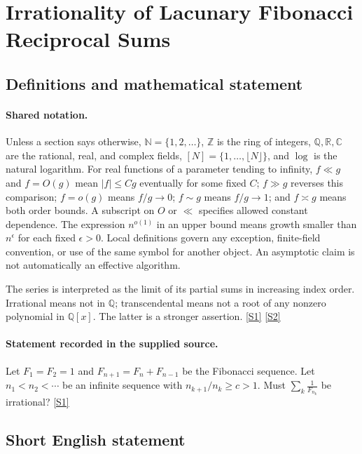 \documentclass[11pt,a4paper]{article}
\newcommand{\N}{\mathbb{N}}
\newcommand{\Z}{\mathbb{Z}}
\newcommand{\Q}{\mathbb{Q}}
\newcommand{\R}{\mathbb{R}}
\newcommand{\C}{\mathbb{C}}
\newcommand{\sref}[2]{\hyperlink{source:#1:#2}{[S#2]}}
\begin{document}
\section{Irrationality of Lacunary Fibonacci Reciprocal Sums}\label{statement}


\subsection{Definitions and mathematical statement}

\paragraph{Shared notation.}Unless a section says otherwise, $\N=\{1,2,\ldots\}$,
$\Z$ is the ring of integers, $\Q,\R,\C$ are the rational, real, and complex
fields, $[N]=\{1,\ldots,\lfloor N\rfloor\}$, and $\log$ is the natural
logarithm. For real functions of a parameter tending to infinity,
$f\ll g$ and $f=O(g)$ mean $|f|\leq Cg$ eventually for some fixed $C$;
$f\gg g$ reverses this comparison; $f=o(g)$ means $f/g\to0$;
$f\sim g$ means $f/g\to1$; and $f\asymp g$ means both order bounds.
A subscript on $O$ or $\ll$ specifies allowed constant dependence.
The expression $n^{o(1)}$ in an upper bound means growth smaller than
$n^\epsilon$ for each fixed $\epsilon>0$. Local definitions govern any
exception, finite-field convention, or use of the same symbol for another
object. An asymptotic claim is not automatically an effective algorithm.



The series is interpreted as the limit of its partial sums in increasing index order. Irrational means not in $\Q$; transcendental means not a root of any nonzero polynomial in $\Q[x]$. The latter is a stronger assertion. \sref{statement}{1} \sref{statement}{2}

\paragraph{Statement recorded in the supplied source.}
Let $F_1=F_2=1$ and $F_{n+1}=F_n+F_{n-1}$ be the Fibonacci sequence. Let $n_1<n_2<\cdots $ be an infinite sequence with $n_{k+1}/n_k \geq c>1$. Must $ \sum_k\frac{1}{F_{n_k}} $ be irrational? \sref{statement}{1}

\subsection{Short English statement}
\end{document}
